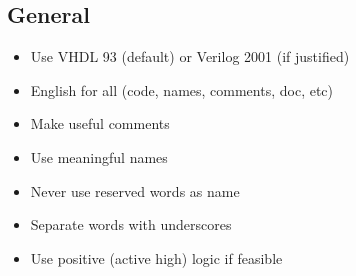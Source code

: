 \documentclass{article}
\begin{document}
\begin{multicols}{3}
  \section*{General}
    \begin{itemize}
      \item Use VHDL 93 (default) or Verilog 2001 (if justified)
      \item English for all (code, names, comments, doc, etc)
      \item Make useful comments
      \item Use meaningful names
      \item Never use reserved words as name
      \item Separate words with underscores
      \item Use positive (active high) logic if feasible
    \end{itemize}

\end{multicols}
\end{document}
